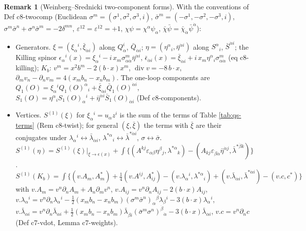 \documentclass[11pt]{article}
\numberwithin{equation}{section}
\theoremstyle{plain}
\theoremstyle{definition}
\newtheorem{remark}[theorem]{Remark}
\begin{document}
\begin{remark}[Weinberg--Srednicki two-component forms]
\label{rem:qs-twocomp}
With the conventions of Def c8-twocomp (Euclidean $\sigma^m=(\sigma^1,\sigma^2,\sigma^3,i)$, $\bar\sigma^m=(-\sigma^1,-\sigma^2,-\sigma^3,i)$, $\sigma^m\bar\sigma^n+\sigma^n\bar\sigma^m=-2\delta^{mn}$, $\varepsilon^{12}=\varepsilon^{\dot1\dot2}=+1$, $\chi\psi=\chi^\alpha\psi_\alpha$, $\bar\chi\bar\psi=\bar\chi_{\dot\alpha}\bar\psi^{\dot\alpha}$):
\begin{itemize}
\item Generators. $\xi=(\xi_\alpha{}^i,\bar\xi_{\dot\alpha i})$ along $Q^i_\alpha$, $\bar Q_{\dot\alpha i}$; $\eta=(\eta^\alpha{}_i,\bar\eta^{\dot\alpha i})$ along $S^\alpha{}_i$, $\bar S^{\dot\alpha i}$; the Killing spinor $\epsilon_\alpha{}^i(x)=\xi_\alpha{}^i-i\,x_m\sigma^m_{\alpha\dot\alpha}\bar\eta^{\dot\alpha i}$, $\bar\epsilon_{\dot\alpha i}(x)=\bar\xi_{\dot\alpha i}+i\,x_m\eta^\alpha{}_i\sigma^m_{\alpha\dot\alpha}$ (eq c8-killing); $K_b$: $v^m=x^2b^m-2(b\cdot x)x^m$, $\operatorname{div}v=-8\,b\cdot x$, $\partial_mv_n-\partial_nv_m=4(x_mb_n-x_nb_m)$. The one-loop components are $Q_1(O)=\xi_\alpha{}^iQ_1(O)^\alpha{}_i+\bar\xi_{\dot\alpha i}\bar Q_1(O)^{\dot\alpha i}$, $S_1(O)=\eta^\alpha{}_iS_1(O)_\alpha{}^i+\bar\eta^{\dot\alpha i}\bar S_1(O)_{\dot\alpha i}$ (Def c8-components).
\item Vertices. $S^{(1)}(\xi)$ for $\xi_\alpha{}^i=u_\alpha z^i$ is the sum of the terms of Table \ref{tab:qs-terms} (Rem c8-twist); for general $(\xi,\bar\xi)$ the terms with $\bar\xi$ are their conjugates under $\lambda_\alpha{}^i\leftrightarrow\bar\lambda_{\dot\alpha i}$, $\lambda^{*\alpha}{}_i\leftrightarrow\bar\lambda^{*\dot\alpha i}$, $\sigma\leftrightarrow\bar\sigma$. $S^{(1)}(\eta)=S^{(1)}(\xi)|_{\xi\to\epsilon(x)}+\int\big\{(A^{kj}\varepsilon_{\alpha\beta}\eta^\beta{}_j,\lambda^{*\alpha}{}_k)-(A_{kj}\varepsilon_{\dot\beta\dot\alpha}\bar\eta^{\dot\alpha j},\bar\lambda^{*\dot\beta k})\big\}$. $S^{(1)}(K_b)=\int\big\{(v.A_m,A^*_m)+\tfrac14(v.A^{ij},A^*_{ij})-(v.\lambda_\alpha{}^i,\lambda^{*\alpha}{}_i)+(v.\bar\lambda_{\dot\alpha i},\bar\lambda^{*\dot\alpha i})-(v.c,c^*)\big\}$ with $v.A_m=v^n\partial_nA_m+A_n\partial_mv^n$, $v.A_{ij}=v^n\partial_nA_{ij}-2(b\cdot x)A_{ij}$, $v.\lambda_\alpha{}^i=v^n\partial_n\lambda_\alpha{}^i-\tfrac12(x_mb_n-x_nb_m)(\sigma^m\bar\sigma^n)_\alpha{}^\beta\lambda_\beta{}^i-3(b\cdot x)\lambda_\alpha{}^i$, $v.\bar\lambda_{\dot\alpha i}=v^n\partial_n\bar\lambda_{\dot\alpha i}+\tfrac12(x_mb_n-x_nb_m)\bar\lambda_{\dot\beta i}(\bar\sigma^m\sigma^n)^{\dot\beta}{}_{\dot\alpha}-3(b\cdot x)\bar\lambda_{\dot\alpha i}$, $v.c=v^n\partial_nc$ (Def c7-vdot, Lemma c7-weights).

\end{itemize}
\end{remark}
\end{document}
